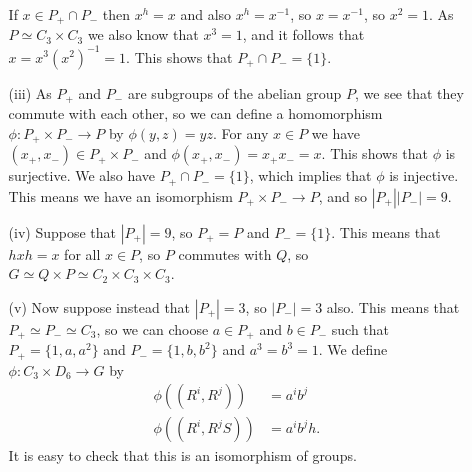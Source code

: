 \documentclass{amsart}
\newcommand{\xra}{\xrightarrow}
\renewcommand{\:}{\colon}
\newcommand{\tm}{\times}
\theoremstyle{definition}
\newenvironment{solution}{{\noindent\bf Solution:}}{}
\begin{document}
\begin{solution}
\begin{itemize}
\begin{itemize}
     If $x\in P_+\cap P_-$ then $x^h=x$ and also $x^h=x^{-1}$, so
     $x=x^{-1}$, so $x^2=1$.  As $P\simeq C_3\tm C_3$ we also know
     that $x^3=1$, and it follows that $x=x^3(x^2)^{-1}=1$.  This
     shows that $P_+\cap P_-=\{1\}$.
    \item[(iii)] As $P_+$ and $P_-$ are subgroups of the abelian group
     $P$, we see that they commute with each other, so we can define a
     homomorphism $\phi\:P_+\tm P_-\xra{}P$ by $\phi(y,z)=yz$.  For
     any $x\in P$ we have $(x_+,x_-)\in P_+\tm P_-$ and
     $\phi(x_+,x_-)=x_+x_-=x$.  This shows that $\phi$ is surjective.
     We also have $P_+\cap P_-=\{1\}$, which implies that $\phi$ is
     injective.  This means we have an isomorphism
     $P_+\tm P_-\xra{}P$, and so $|P_+||P_-|=9$.
    \item[(iv)] Suppose that $|P_+|=9$, so $P_+=P$ and $P_-=\{1\}$.
     This means that $hxh=x$ for all $x\in P$, so $P$ commutes with
     $Q$, so $G\simeq Q\tm P\simeq C_2\tm C_3\tm C_3$.
    \item[(v)] Now suppose instead that $|P_+|=3$, so $|P_-|=3$ also.
     This means that $P_+\simeq P_-\simeq C_3$, so we can choose
     $a\in P_+$ and $b\in P_-$ such that $P_+=\{1,a,a^2\}$ and
     $P_-=\{1,b,b^2\}$ and $a^3=b^3=1$.  We define
     $\phi\:C_3\tm D_6\xra{}G$ by 
     \begin{align*}
      \phi((R^i,R^j))  &= a^i b^j \\
      \phi((R^i,R^jS)) &= a^i b^j h.
     \end{align*}
     It is easy to check that this is an isomorphism of groups.
   \end{itemize}
 \end{itemize}
\end{solution}
\end{document}
